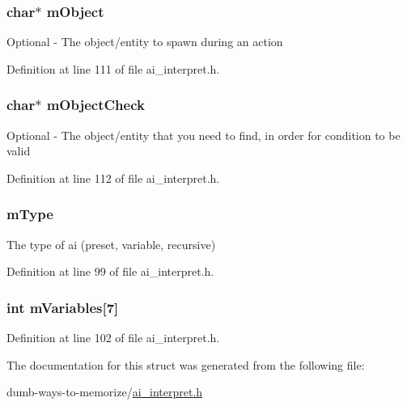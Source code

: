 \subsubsection[{\texorpdfstring{m\+Object}{mObject}}]{\setlength{\rightskip}{0pt plus 5cm}char$\ast$ m\+Object}\hypertarget{structai__function__s_ad290bc1093389f523421449cfcab6a9c}{}\label{structai__function__s_ad290bc1093389f523421449cfcab6a9c}
Optional -\/ The object/entity to spawn during an action 

Definition at line 111 of file ai\+\_\+interpret.\+h.

\subsubsection[{\texorpdfstring{m\+Object\+Check}{mObjectCheck}}]{\setlength{\rightskip}{0pt plus 5cm}char$\ast$ m\+Object\+Check}\hypertarget{structai__function__s_ae9037e9c23c85312470746c5c4379814}{}\label{structai__function__s_ae9037e9c23c85312470746c5c4379814}
Optional -\/ The object/entity that you need to find, in order for condition to be valid 

Definition at line 112 of file ai\+\_\+interpret.\+h.

\subsubsection[{\texorpdfstring{m\+Type}{mType}}]{ m\+Type}\hypertarget{structai__function__s_af4cc7fbcaa3a1268cb1a174203486a8c}{}\label{structai__function__s_af4cc7fbcaa3a1268cb1a174203486a8c}
The type of ai (preset, variable, recursive) 

Definition at line 99 of file ai\+\_\+interpret.\+h.

\subsubsection[{\texorpdfstring{m\+Variables}{mVariables}}]{\setlength{\rightskip}{0pt plus 5cm}int m\+Variables\mbox{[}7\mbox{]}}\hypertarget{structai__function__s_a889d5923f6b7628af2fe824149b5a942}{}\label{structai__function__s_a889d5923f6b7628af2fe824149b5a942}


Definition at line 102 of file ai\+\_\+interpret.\+h.



The documentation for this struct was generated from the following file\+:\begin{DoxyCompactItemize}
\item 
dumb-\/ways-\/to-\/memorize/\hyperlink{ai__interpret_8h}{ai\+\_\+interpret.\+h}\end{DoxyCompactItemize}
